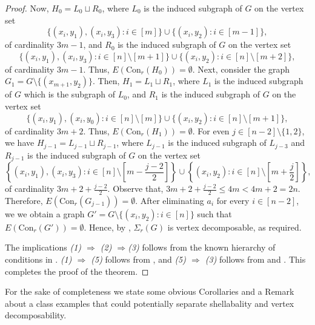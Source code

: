 \documentclass[12pt,reqno]{amsart}
\theoremstyle{definition}
\newcommand{\Con}{{\mathrm{Con}}}
\begin{document}
\begin{proof}
		Now, $H_0 = L_0 \sqcup R_0$, where $L_0$ is the induced subgraph of $G$ on the vertex set 
        \[
        \{(x_i,y_1), (x_i,y_3) : i \in [m]\} \cup \{(x_i,y_2) : i \in [m-1]\},
        \]
        of cardinality $3m -1$, and $R_0$ is the induced subgraph of $G$ on the vertex set 
        \[
        \{(x_i,y_1), (x_i,y_3) : i \in [n] \setminus [m+1]\} \cup \{(x_i,y_2) : i \in [n] \setminus [m+2]\},
        \]
        of cardinality $3m-1$. Thus, $E(\Con_r(H_{0})) = \emptyset$.  Next, consider the graph $G_1 = G \setminus \{(x_{m+1},y_2)\}$. Then, $H_1 = L_1 \sqcup R_1$, where $L_1$ is the induced subgraph of $G$ which is the subgraph of $L_0$, and $R_1$ is the induced subgraph of $G$ on the vertex set \[
        \{(x_i,y_1), (x_i,y_0) : i \in [n] \setminus [m]\} \cup \{(x_i,y_2) : i \in [n] \setminus [m+1]\},
        \]
        of cardinality $3m+2$. Thus, $E(\Con_r(H_{1})) = \emptyset$. For even $j \in [n-2] \setminus \{1,2\}$, we have $H_{j-1} = L_{j-1} \sqcup R_{j-1}$,
		where $L_{j-1}$ is the induced subgraph of $L_{j-3}$ and $R_{j-1}$ is the induced subgraph of $G$  on the vertex set 
        \[
        \left\{(x_i,y_1), (x_i,y_3) : i \in [n] \setminus \left[m-\frac{j-2}{2}\right]\right\} \cup \left\{(x_i,y_2) : i \in [n] \setminus \left[m+\frac{j}{2}\right]\right\},
        \]
        of cardinality $3m+2+\frac{j-2}{2}$. Observe that, $3m+2+\frac{j-2}{2} \le 4m < 4m+2 = 2n$. Therefore, $E(\Con_r(G_{j-1})) = \emptyset$. After eliminating $a_i$ for every $i \in [n-2]$, we we obtain a graph $G'=G \setminus \{(x_i,y_2): i\in[n]\}$ such that $E(\Con_r(G'))=\emptyset$. Hence, by , $\Sigma_r(G)$ is vertex decomposable, as required.

        The implications \emph{(1) $\Rightarrow$ (2) $\Rightarrow$(3)} follows from the known hierarchy of conditions in . \emph{(1) $\Rightarrow$ (5)} follows from , and \emph{(5) $\Rightarrow$ (3)} follows from \cite[Theorem 3.3]{SBCC} and \cite[Theorem 3]{EagonReiner1998}. This completes the proof of the theorem.
	\end{proof}

For the sake of completeness we state some obvious Corollaries and a Remark about a class examples that could potentially separate shellabality and vertex decomposability. 
\end{document}
